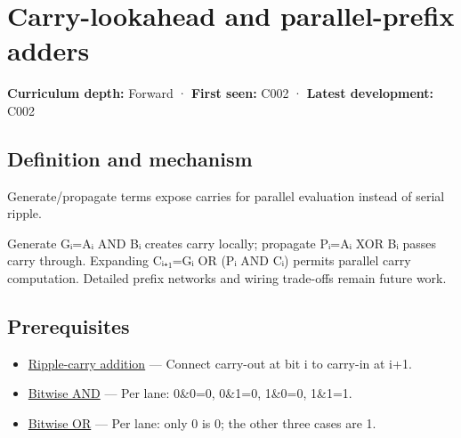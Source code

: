 \hypertarget{appendix-b5c46b2d94ff}{}\label{referencestart:appendix-b5c46b2d94ff}
\section{Carry-lookahead and parallel-prefix adders}\label{appendix-b5c46b2d94ff-carry-lookahead-and-parallel-prefix-adders}

\hypertarget{appendix-b5c46b2d94ff-carry-lookahead-and-parallel-prefix-adders}{}

\textbf{Curriculum depth:} Forward · \textbf{First seen:} C002 · \textbf{Latest development:} C002

\begin{allmightroledefinition}

\subsection{Definition and mechanism}\label{appendix-b5c46b2d94ff-definition-and-mechanism}

\hypertarget{appendix-b5c46b2d94ff-definition-and-mechanism}{}

Generate/propagate terms expose carries for parallel evaluation instead of serial ripple.

\end{allmightroledefinition}

Generate Gᵢ=Aᵢ AND Bᵢ creates carry locally; propagate Pᵢ=Aᵢ XOR Bᵢ passes carry through. Expanding Cᵢ₊₁=Gᵢ OR (Pᵢ AND Cᵢ) permits parallel carry computation. Detailed prefix networks and wiring trade-offs remain future work.

\subsection{Prerequisites}\label{appendix-b5c46b2d94ff-prerequisites}

\hypertarget{appendix-b5c46b2d94ff-prerequisites}{}

\begin{itemize}
\tightlist
\item
  \hyperref[appendix-17917d9fdbe3]{Ripple-carry addition} --- Connect carry-out at bit i to carry-in at i+1.
\item
  \hyperref[appendix-68b52453737c]{Bitwise AND} --- Per lane: 0\&0=0, 0\&1=0, 1\&0=0, 1\&1=1.
\item
  \hyperref[appendix-a427ce8ce8a6]{Bitwise OR} --- Per lane: only 0 is 0; the other three cases are 1.
\end{itemize}

